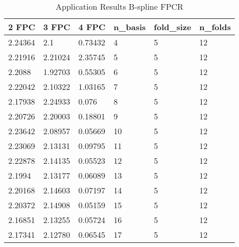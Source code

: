 \begin{table}[H]
			\centering
			\caption{Application Results B-spline FPCR}
				\begin{tabular}{|lll|lll|}
\hline
2 FPC & 3 FPC & 4 FPC                        & \textbf{n\_basis} & \textbf{fold\_size} & \textbf{n\_folds} \\ \hline
2.24364                        & 2.1                            & 0.73432                       & 4       & 5         & 12      \\
2.21916                        & 2.21024                        & 2.35745                       & 5       & 5         & 12      \\
2.2088                         & 1.92703                        & 0.55305                       & 6       & 5         & 12      \\
2.22042                        & 2.10322                        & 1.03165                       & 7       & 5         & 12      \\
2.17938                        & 2.24933                        & 0.076                         & 8       & 5         & 12      \\
2.20726                        & 2.20003                        & 0.18801                       & 9       & 5         & 12      \\
2.23642                        & 2.08957                        & 0.05669                       & 10      & 5         & 12      \\
2.23069                        & 2.13131                        & 0.09795                       & 11      & 5         & 12      \\
2.22878                        & 2.14135                        & 0.05523                       & 12      & 5         & 12      \\
2.1994                         & 2.13177                        & 0.06089                       & 13      & 5         & 12      \\
2.20168                        & 2.14603                        & 0.07197                       & 14      & 5         & 12      \\
2.20372                        & 2.14908                        & 0.05159                       & 15      & 5         & 12      \\
2.16851                        & 2.13255                        & 0.05724                       & 16      & 5         & 12      \\
2.17341                        & 2.12780                        & 0.06545                       & 17      & 5         & 12      \\

\end{tabular}
\end{table}
